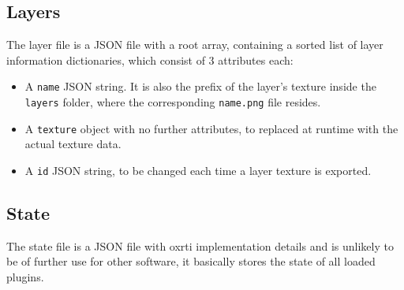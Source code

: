 \hypertarget{Layers}{%
  \subsection{Layers}\label{Layers}}
The layer file is a JSON file with a root array, containing a sorted list of layer
information dictionaries, which consist of 3 attributes each:
\begin{itemize}
\item A \texttt{name} JSON string. It is also the prefix of the layer's
  texture inside the \texttt{layers} folder, where the corresponding
  \texttt{name.png} file resides.
\item A \texttt{texture} object with no further attributes, to replaced at
  runtime with the actual texture data.
\item A \texttt{id} JSON string, to be changed each time a layer texture is exported.
\end{itemize}

\hypertarget{State}{%
  \subsection{State}\label{State}}
The state file is a JSON file with oxrti implementation details and is unlikely
to be of further use for other software, it basically stores the state of all
loaded plugins.